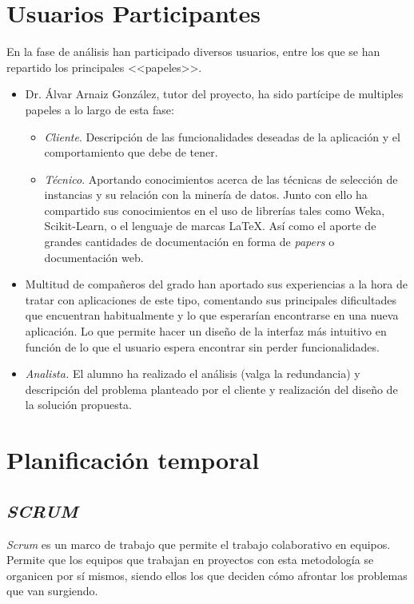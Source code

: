 \section{Usuarios Participantes}\label{usuarios-participantes}
En la fase de análisis han participado diversos usuarios, entre los que se han repartido los principales <<papeles>>.
\begin{itemize}
\item Dr. Álvar Arnaiz González, tutor del proyecto, ha sido partícipe de multiples papeles a lo largo de esta fase:
\begin{itemize}
\item \textit{Cliente}. Descripción de las funcionalidades deseadas de la aplicación y el comportamiento que debe de tener.
\item \textit{Técnico}. Aportando conocimientos acerca de las técnicas de selección de instancias y su relación con la minería de datos. Junto con ello ha compartido sus conocimientos en el uso de librerías tales como Weka, Scikit-Learn, o el lenguaje de marcas \LaTeX. Así como el aporte de grandes cantidades de documentación en forma de \textit{papers} o documentación web. 
\end{itemize}
\item Multitud de compañeros del grado han aportado sus experiencias a la hora de tratar con aplicaciones de este tipo, comentando sus principales dificultades que encuentran habitualmente y lo que esperarían encontrarse en una nueva aplicación. Lo que permite hacer un diseño de la interfaz más intuitivo en función de lo que el usuario espera encontrar sin perder funcionalidades.
\item \textit{Analista.} El alumno ha realizado el análisis (valga la redundancia) y descripción del problema planteado por el cliente y realización del diseño de la solución propuesta.
\end{itemize}

\section{Planificación temporal}
\subsection{\textit{SCRUM}}
\textit{Scrum} es un marco de trabajo que permite el trabajo colaborativo en equipos. Permite que los equipos que trabajan en proyectos con esta metodología se organicen por sí mismos, siendo ellos los que deciden cómo afrontar los problemas que van surgiendo. 

